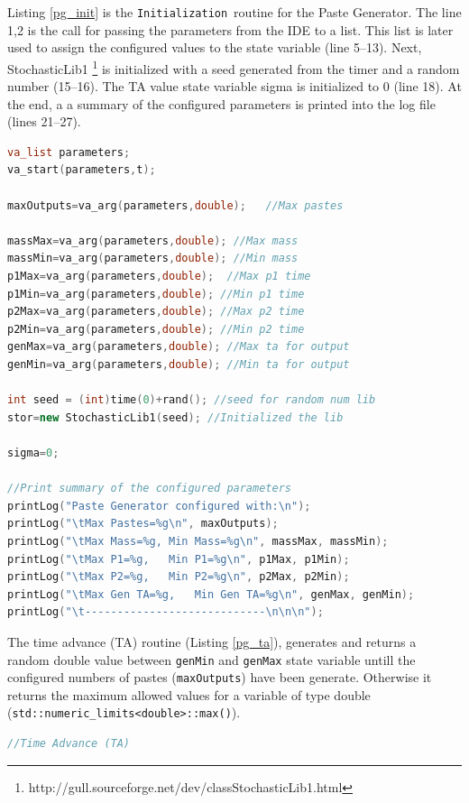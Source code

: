 \documentclass[titlepage]{report}%
\newcommand{\pgen}{\texttt{Paste Generator}~}
\newcommand{\init}{\texttt{Initialization}~}
\begin{document}
{\begin{lstlisting}[caption={State variables and objects}, language=c++, label={pg_state_var}]
\end{lstlisting}

Listing \ref{pg_init} is the \init routine for the Paste Generator. The line 1,2 is the call for passing the parameters from the IDE to a list. This list is later used to assign the configured values to the state variable (line 5--13). Next,  StochasticLib1 \footnote{http://gull.sourceforge.net/dev/classStochasticLib1.html} is initialized with a seed generated from the timer and a random number (15--16). The TA value state variable sigma is initialized to 0 (line 18). At the end, a a summary of the configured parameters is printed into the log file (lines 21--27).

\begin{lstlisting}[caption={The \init for the \pgen }, language=c++, label={pg_init}]
va_list parameters;
va_start(parameters,t);

maxOutputs=va_arg(parameters,double);	//Max pastes

massMax=va_arg(parameters,double); //Max mass
massMin=va_arg(parameters,double); //Min mass
p1Max=va_arg(parameters,double);  //Max p1 time
p1Min=va_arg(parameters,double); //Min p1 time
p2Max=va_arg(parameters,double); //Max p2 time
p2Min=va_arg(parameters,double); //Min p2 time
genMax=va_arg(parameters,double); //Max ta for output
genMin=va_arg(parameters,double); //Min ta for output

int seed = (int)time(0)+rand(); //seed for random num lib
stor=new StochasticLib1(seed); //Initialized the lib

sigma=0;												

//Print summary of the configured parameters
printLog("Paste Generator configured with:\n");
printLog("\tMax Pastes=%g\n", maxOutputs);
printLog("\tMax Mass=%g, Min Mass=%g\n", massMax, massMin);
printLog("\tMax P1=%g,   Min P1=%g\n", p1Max, p1Min);
printLog("\tMax P2=%g,   Min P2=%g\n", p2Max, p2Min);
printLog("\tMax Gen TA=%g,   Min Gen TA=%g\n", genMax, genMin);
printLog("\t----------------------------\n\n\n");
\end{lstlisting}	


The time advance (TA) routine (Listing \ref{pg_ta}), generates and returns a random double value between \texttt{genMin} and \texttt{genMax} state variable untill the configured numbers of pastes (\texttt{maxOutputs}) have been generate. Otherwise it returns the maximum allowed values for a variable of type double (\texttt{std::numeric\_limits<double>::max()}).

\begin{lstlisting}[caption={The TA (Time Advance) function}, language=c++, label={pg_ta}]
//Time Advance (TA)


\end{lstlisting}}
\end{document}
